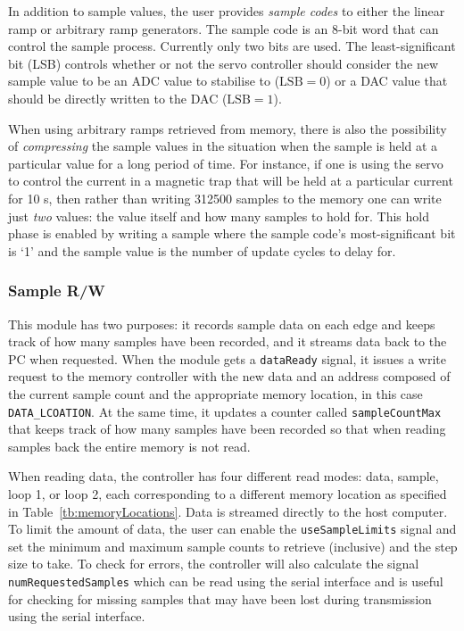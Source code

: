 \documentclass{article}
\begin{document}
In addition to sample values, the user provides \emph{sample codes} to either the linear ramp or arbitrary ramp generators.  The sample code is an 8-bit word that can control the sample process.  Currently only two bits are used.  The least-significant bit (LSB) controls whether or not the servo controller should consider the new sample value to be an ADC value to stabilise to ($\mathrm{LSB}=0$) or a DAC value that should be directly written to the DAC ($\mathrm{LSB}=1$). 

 When using arbitrary ramps retrieved from memory, there is also the possibility of \emph{compressing} the sample values in the situation when the sample is held at a particular value for a long period of time.  For instance, if one is using the servo to control the current in a magnetic trap that will be held at a particular current for 10 s, then rather than writing 312500 samples to the memory one can write just \emph{two} values: the value itself and how many samples to hold for.  This hold phase is enabled by writing a sample where the sample code's most-significant bit is `1' and the sample value is the number of update cycles to delay for.

\subsubsection{Sample R/W}
\label{sssec:sampleRW}
This module has two purposes: it records sample data on each edge and keeps track of how many samples have been recorded, and it streams data back to the PC when requested.  When the module gets a \verb|dataReady| signal, it issues a write request to the memory controller with the new data and an address composed of the current sample count and the appropriate memory location, in this case \verb|DATA_LCOATION|.  At the same time, it updates a counter called \verb|sampleCountMax| that keeps track of how many samples have been recorded so that when reading samples back the entire memory is not read.

When reading data, the controller has four different read modes: data, sample, loop 1, or loop 2, each corresponding to a different memory location as specified in Table~\ref{tb:memoryLocations}.  Data is streamed directly to the host computer.  To limit the amount of data, the user can enable the \verb|useSampleLimits| signal and set the minimum and maximum sample counts to retrieve (inclusive) and the step size to take.  To check for errors, the controller will also calculate the signal \verb|numRequestedSamples| which can be read using the serial interface and is useful for checking for missing samples that may have been lost during transmission using the serial interface.
\end{document}
